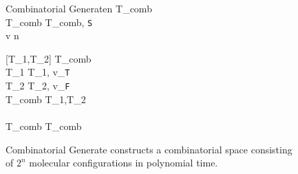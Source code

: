 


\begin{figure}[htbp]
\begin{center}

	\begin{pseudocode}{Combinatorial Generate}{n}
		T_{comb} \GETS \emptyset \\
		T_{comb} \GETS {}T_{comb}, \texttt{S} \text{)} \\ 
	
		\FOR v   n \DO
			\BEGIN
			
			[T_1,T_2] \GETS {} T_{comb}\text{)}\\
			T_1 \GETS {}T_1, v_{\texttt{T}} \text{)}\\
			T_2 \GETS {}T_2, v_{\texttt{F}} \text{)}\\
			T_{comb} \GETS {}T_1,T_2\text{)}\\
		\END
		\\
		T_{comb} \GETS {}T_{comb}\text{)} \\
	\end{pseudocode}

\caption{{\sc Combinatorial Generate} constructs a combinatorial space consisting of $2^n$ molecular configurations in polynomial time.}
\label{combinatorialGenerate}
\end{center}
\end{figure}

